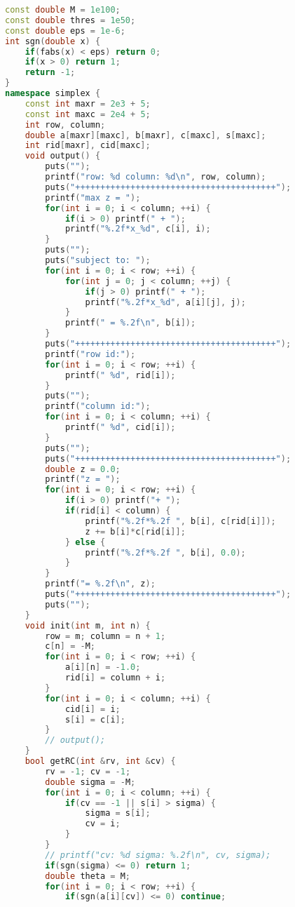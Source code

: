 \begin{lstlisting}[language=C++]
const double M = 1e100;
const double thres = 1e50;
const double eps = 1e-6;
int sgn(double x) {
    if(fabs(x) < eps) return 0;
    if(x > 0) return 1;
    return -1;
}
namespace simplex {
    const int maxr = 2e3 + 5;
    const int maxc = 2e4 + 5;
    int row, column;
    double a[maxr][maxc], b[maxr], c[maxc], s[maxc];
    int rid[maxr], cid[maxc];
    void output() {
        puts("");
        printf("row: %d column: %d\n", row, column);
        puts("++++++++++++++++++++++++++++++++++++++++");
        printf("max z = ");
        for(int i = 0; i < column; ++i) {
            if(i > 0) printf(" + ");
            printf("%.2f*x_%d", c[i], i);
        }
        puts("");
        puts("subject to: ");
        for(int i = 0; i < row; ++i) {
            for(int j = 0; j < column; ++j) {
                if(j > 0) printf(" + ");
                printf("%.2f*x_%d", a[i][j], j);
            }
            printf(" = %.2f\n", b[i]);
        }
        puts("++++++++++++++++++++++++++++++++++++++++");
        printf("row id:");
        for(int i = 0; i < row; ++i) {
            printf(" %d", rid[i]);
        }
        puts("");
        printf("column id:");
        for(int i = 0; i < column; ++i) {
            printf(" %d", cid[i]);
        }
        puts("");
        puts("++++++++++++++++++++++++++++++++++++++++");
        double z = 0.0;
        printf("z = ");
        for(int i = 0; i < row; ++i) {
            if(i > 0) printf("+ ");
            if(rid[i] < column) {
                printf("%.2f*%.2f ", b[i], c[rid[i]]);
                z += b[i]*c[rid[i]];
            } else {
                printf("%.2f*%.2f ", b[i], 0.0);
            }
        }
        printf("= %.2f\n", z);
        puts("++++++++++++++++++++++++++++++++++++++++");
        puts("");
    }
    void init(int m, int n) {
        row = m; column = n + 1;
        c[n] = -M;
        for(int i = 0; i < row; ++i) {
            a[i][n] = -1.0;
            rid[i] = column + i;
        }
        for(int i = 0; i < column; ++i) {
            cid[i] = i;
            s[i] = c[i];
        }
        // output();
    }
    bool getRC(int &rv, int &cv) {
        rv = -1; cv = -1;
        double sigma = -M;
        for(int i = 0; i < column; ++i) {
            if(cv == -1 || s[i] > sigma) {
                sigma = s[i];
                cv = i;
            }
        }
        // printf("cv: %d sigma: %.2f\n", cv, sigma);
        if(sgn(sigma) <= 0) return 1;
        double theta = M;
        for(int i = 0; i < row; ++i) {
            if(sgn(a[i][cv]) <= 0) continue;

\end{lstlisting}
